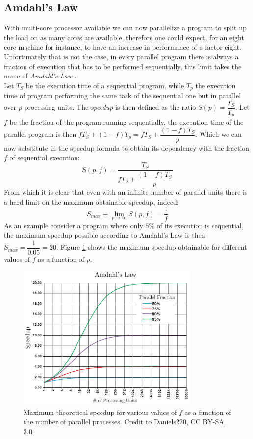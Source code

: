 \subsection{Amdahl's Law}
With multi-core processor available we can now parallelize a program to split up the load on as many cores are available, therefore one could expect, for an eight core machine for instance, to have an increase in performance of a factor eight. Unfortunately that is not the case, in every parallel program there is always a fraction of execution that has to be performed sequentially, this limit takes the name of \textit{Amdahl's Law} \cite{amdahl}.\\
Let $T_S$ be the execution time of a sequential program, while $T_p$ the execution time of program performing the same task of the sequential one but in parallel over $p$ processing units. The \textit{speedup} is then defined as the ratio $S(p) = \dfrac{T_S}{T_p}$.
Let $f$ be the fraction of the program running sequentially, the execution time of the parallel program is then $f T_S + (1 - f) T_p = f T_S + \dfrac{(1-f)T_S}{p}$. Which we can now substitute in the speedup formula to obtain its dependency with the fraction $f$ of sequential execution:
\begin{equation}
S(p,f) = \dfrac{T_S}{f T_S + \dfrac{(1-f)T_S}{p}}
\end{equation}
From which it is clear that even with an infinite number of parallel units there is a hard limit on the maximum obtainable speedup, indeed:
\begin{equation}
S_{max} \equiv \lim_{p\to\infty} S(p,f) = \dfrac{1}{f}
\end{equation}
As an example consider a program where only $5\%$ of its execution is sequential, the maximum speedup possible according to Amdahl's Law is then $S_{max} = \dfrac{1}{0.05} = 20$.
Figure \ref{amdahl} shows the maximum speedup obtainable for different values of $f$ as a function of $p$.

\begin{figure}
\centerline{\includegraphics[width=0.8\textwidth]{architectures/amdahl.png}}
\caption{Maximum theoretical speedup for various values of $f$ as a function of the number of parallel processes. Credit to \href{https://en.wikipedia.org/wiki/User:Daniels220}{Daniels220}, \href{http://creativecommons.org/licenses/by-sa/3.0/}{CC BY-SA 3.0}}
\label{amdahl}
\end{figure}

